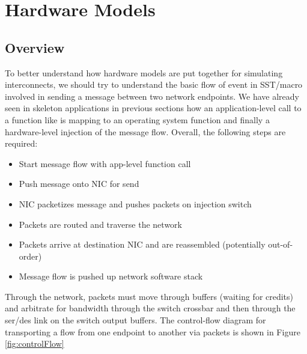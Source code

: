 

\chapter{Hardware Models}
\label{chapter:hardware}

\section{Overview}
\label{sec:topOverview}
To better understand how hardware models are put together for simulating interconnects, we should try to understand the basic flow of event in SST/macro involved in sending a message between two network endpoints.  We have already seen in skeleton applications in previous sections how an application-level call to a function like  is mapping to an operating system function and finally a hardware-level injection of the message flow.  Overall, the following steps are required:

\begin{itemize}
\item Start message flow with app-level function call
\item Push message onto NIC for send
\item NIC packetizes message and pushes packets on injection switch
\item Packets are routed and traverse the network
\item Packets arrive at destination NIC and are reassembled (potentially out-of-order)
\item Message flow is pushed up network software stack
\end{itemize}

Through the network, packets must move through buffers (waiting for credits) and arbitrate for bandwidth through the switch crossbar and then through the ser/des link on the switch output buffers.  The control-flow diagram for transporting a flow from one endpoint to another via packets is shown in Figure \ref{fig:controlFlow}

